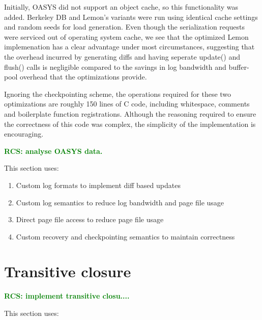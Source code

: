 \documentclass[letterpaper,twocolumn,english]{article}
\newcommand{\yad}{Lemon\xspace}
\newcommand{\rcs}[1]{\textcolor{green}{\bf RCS: #1}}
\begin{document}
Initially, OASYS did not support an object cache, so this
functionality was added.  Berkeley DB and \yad's variants were run
using identical cache settings and random seeds for load generation.
Even though the serialization requests were serviced out of operating
system cache, we see that the optimized \yad implemenation has a
clear advantage under most circumstances, suggesting that the overhead
incurred by generating diffs and having seperate update() and flush()
calls is negligible compared to the savings in log bandwidth and
buffer-pool overhead that the optimizations provide.

Ignoring the checkpointing scheme, the operations required for these
two optimizations are roughly 150 lines of C code, including
whitespace, comments and boilerplate function registrations.  Although
the reasoning required to ensure the correctness of this code was
complex, the simplicity of the implementation is encouraging.

\rcs{analyse OASYS data.}

This section uses:

\begin{enumerate}
\item{Custom log formats to implement diff based updates}
\item{Custom log semantics to reduce log bandwidth and page file usage}
\item{Direct page file access to reduce page file usage}
\item{Custom recovery and checkpointing semantics to maintain correctness}
\end{enumerate}

\section{Transitive closure\label{TransClos}}

\rcs{implement transitive closu....}

This section uses:
\end{document}
